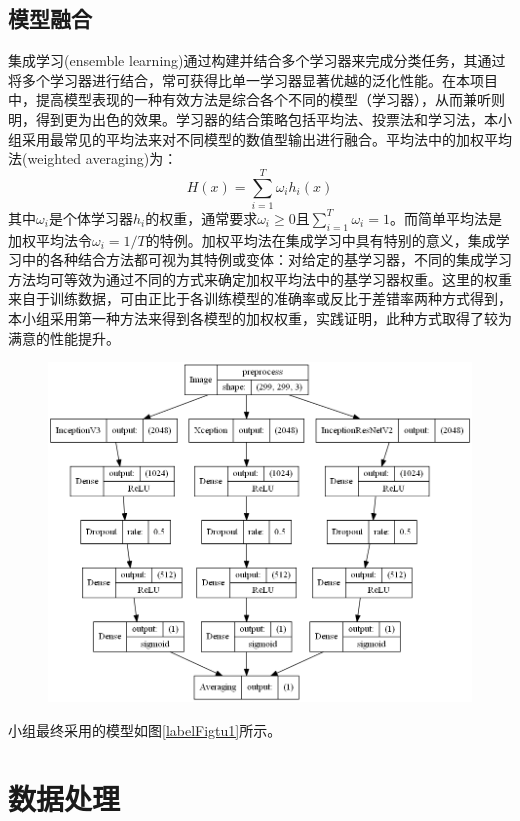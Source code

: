 \documentclass[10.5pt,twocolumn]{jbuaa}
\begin{document}
\subsection{模型融合}
集成学习(ensemble learning)通过构建并结合多个学习器来完成分类任务，其通过将多个学习器进行结合，常可获得比单一学习器显著优越的泛化性能。在本项目中，提高模型表现的一种有效方法是综合各个不同的模型（学习器），从而兼听则明，得到更为出色的效果。学习器的结合策略包括平均法、投票法和学习法，本小组采用最常见的平均法来对不同模型的数值型输出进行融合。平均法中的加权平均法(weighted averaging)为：
\begin{equation}
\label{eqnLabel}
H(x)=\sum_{i=1}^{T}\omega_{i}h_{i}(x)
\end{equation}
其中$\omega_{i}$是个体学习器$h_{i}$的权重，通常要求$\omega_{i}\geq0$且$\sum_{i=1}^{T}\omega_{i}=1$。而简单平均法是加权平均法令$\omega_{i}=1/T$的特例。加权平均法在集成学习中具有特别的意义，集成学习中的各种结合方法都可视为其特例或变体：对给定的基学习器，不同的集成学习方法均可等效为通过不同的方式来确定加权平均法中的基学习器权重。这里的权重来自于训练数据，可由正比于各训练模型的准确率或反比于差错率两种方式得到，本小组采用第一种方法来得到各模型的加权权重，实践证明，此种方式取得了较为满意的性能提升。
\begin{figure}[h!]
\centering
\includegraphics [scale=0.3,trim=0 0 0 0]{./image/final.png}
\end{figure}
小组最终采用的模型如图\ref{labelFigtu1}所示。
\section{数据处理}
\end{document}
